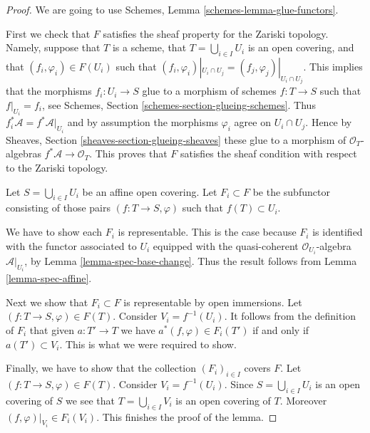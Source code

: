 \documentclass{stacks-project}
\theoremstyle{plain}
\theoremstyle{definition}
\theoremstyle{remark}
\numberwithin{equation}{subsection}
\begin{document}
\begin{proof}
We are going to use Schemes, Lemma \ref{schemes-lemma-glue-functors}.

\medskip\noindent
First we check that $F$ satisfies the sheaf property for the
Zariski topology. Namely, suppose that $T$ is a scheme,
that $T = \bigcup_{i \in I} U_i$ is an open covering,
and that $(f_i, \varphi_i) \in F(U_i)$ such that
$(f_i, \varphi_i)|_{U_i \cap U_j} = (f_j, \varphi_j)|_{U_i \cap U_j}$.
This implies that the morphisms $f_i : U_i \to S$
glue to a morphism of schemes $f : T \to S$ such that
$f|_{U_i} = f_i$, see Schemes, Section \ref{schemes-section-glueing-schemes}.
Thus $f_i^*\mathcal{A} = f^*\mathcal{A}|_{U_i}$ and by assumption the
morphisms $\varphi_i$ agree on $U_i \cap U_j$. Hence by Sheaves,
Section \ref{sheaves-section-glueing-sheaves} these glue to a
morphism of $\mathcal{O}_T$-algebras $f^*\mathcal{A} \to \mathcal{O}_T$.
This proves that $F$ satisfies the sheaf condition with respect to
the Zariski topology.

\medskip\noindent
Let $S = \bigcup_{i \in I} U_i$ be an affine open covering.
Let $F_i \subset F$ be the subfunctor consisting of
those pairs $(f : T \to S, \varphi)$ such that
$f(T) \subset U_i$.

\medskip\noindent
We have to show each $F_i$ is representable.
This is the case because $F_i$ is identified with
the functor associated to $U_i$ equipped with
the quasi-coherent $\mathcal{O}_{U_i}$-algebra $\mathcal{A}|_{U_i}$,
by Lemma \ref{lemma-spec-base-change}.
Thus the result follows from Lemma \ref{lemma-spec-affine}.

\medskip\noindent
Next we show that $F_i \subset F$ is representable by open immersions.
Let $(f : T \to S, \varphi) \in F(T)$. Consider $V_i = f^{-1}(U_i)$.
It follows from the definition of $F_i$ that given $a : T' \to T$
we have $a^*(f, \varphi) \in F_i(T')$ if and only if $a(T') \subset V_i$.
This is what we were required to show.

\medskip\noindent
Finally, we have to show that the collection $(F_i)_{i \in I}$
covers $F$. Let $(f : T \to S, \varphi) \in F(T)$.
Consider $V_i = f^{-1}(U_i)$. Since $S = \bigcup_{i \in I} U_i$
is an open covering of $S$ we see that $T = \bigcup_{i \in I} V_i$
is an open covering of $T$. Moreover $(f, \varphi)|_{V_i} \in F_i(V_i)$.
This finishes the proof of the lemma.
\end{proof}
\end{document}
